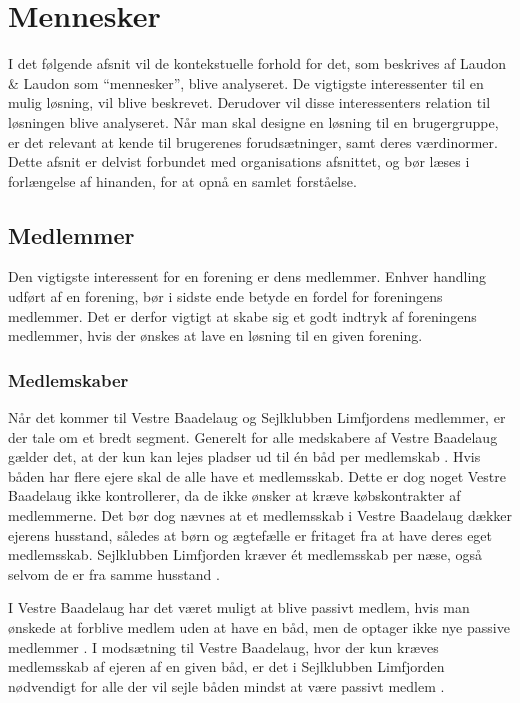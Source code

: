\section{Mennesker}


I det følgende afsnit vil de kontekstuelle forhold for det, som beskrives af Laudon \& Laudon som \enquote{mennesker}, blive analyseret. De vigtigste interessenter til en mulig løsning, vil blive beskrevet. Derudover vil disse interessenters relation til løsningen blive analyseret. Når man skal designe en løsning til en brugergruppe, er det relevant at kende til brugerenes forudsætninger, samt deres værdinormer. Dette afsnit er delvist forbundet med organisations afsnittet, og bør læses i forlængelse af hinanden, for at opnå en samlet forståelse.

\subsection{Medlemmer}

Den vigtigste interessent for en forening er dens medlemmer. Enhver handling udført af en forening, bør i sidste ende betyde en fordel for foreningens medlemmer. Det er derfor vigtigt at skabe sig et godt indtryk af foreningens medlemmer, hvis der ønskes at lave en løsning til en given forening.

\subsubsection{Medlemskaber}

Når det kommer til Vestre Baadelaug og Sejlklubben Limfjordens medlemmer, er der tale om et bredt segment. Generelt for alle medskabere af Vestre Baadelaug gælder det, at der kun kan lejes pladser ud til én båd per medlemskab \cite{vestre_vedtagter}. Hvis båden har flere ejere skal de alle have et medlemsskab. Dette er dog noget Vestre Baadelaug ikke kontrollerer, da de ikke ønsker at kræve købskontrakter af medlemmerne. Det bør dog nævnes at et medlemsskab i Vestre Baadelaug dækker ejerens husstand, således at børn og ægtefælle er fritaget fra at have deres eget medlemsskab. Sejlklubben Limfjorden kræver ét medlemsskab per næse, også selvom de er fra samme husstand \cite{int_vb_sl}.

I Vestre Baadelaug har det været muligt at blive passivt medlem, hvis man ønskede at forblive medlem uden at have en båd, men de optager ikke nye passive medlemmer \cite{vestre_vedtagter}. I modsætning til Vestre Baadelaug, hvor der kun kræves medlemsskab af ejeren af en given båd, er det i Sejlklubben Limfjorden nødvendigt for alle der vil sejle båden mindst at være passivt medlem \cite{int_vb_sl}.

